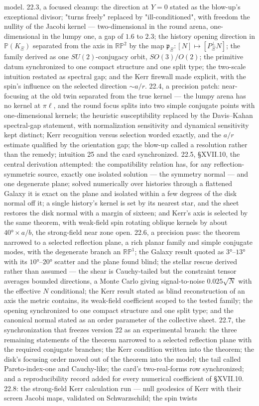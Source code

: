 model. 22.3, a focused cleanup: the direction at $Y = 0$ stated as the blow-up's exceptional divisor; "turns freely" replaced by "ill-conditioned", with freedom the nullity of the Jacobi kernel — two-dimensional in the round arena, one-dimensional in the lumpy one, a gap of $1.6$ to $2.3$; the history opening direction in $\mathbb P(K_\Xi)$ separated from the axis in $\mathbb{RP}^2$ by the map $\mathfrak p_\Xi:[N]\mapsto[P^\perp_\Xi N]$; the family derived as one $SU(2)$-conjugacy orbit, $SO(3)/O(2)$; the primitive datum synchronized to one compact structure and one split type; the two-scale intuition restated as spectral gap; and the Kerr firewall made explicit, with the spin's influence on the selected direction $\sim a/r$. 22.4, a precision patch: near-focusing at the old twin separated from the true kernel — the lumpy arena has no kernel at $\pi\ell$, and the round focus splits into two simple conjugate points with one-dimensional kernels; the heuristic susceptibility replaced by the Davis–Kahan spectral-gap statement, with normalization sensitivity and dynamical sensitivity kept distinct; Kerr recognition versus selection worded exactly, and the $a/r$ estimate qualified by the orientation gap; the blow-up called a resolution rather than the remedy; intuition 25 and the card synchronized. 22.5, §XVII.10, the central derivation attempted: the compatibility relation has, for any reflection-symmetric source, exactly one isolated solution — the symmetry normal — and one degenerate plane; solved numerically over histories through a flattened Galaxy it is exact on the plane and isolated within a few degrees of the disk normal off it; a single history's kernel is set by its nearest star, and the sheet restores the disk normal with a margin of sixteen; and Kerr's axis is selected by the same theorem, with weak-field spin rotating oblique kernels by about $40°\times a/b$, the strong-field near zone open. 22.6, a precision pass: the theorem narrowed to a selected reflection plane, a rich planar family and simple conjugate modes, with the degenerate branch an $\mathbb{RP}^1$; the Galaxy result quoted as $3°$–$13°$ with its $10°$–$20°$ scatter and the plane found blind; the stellar rescue derived rather than assumed — the shear is Cauchy-tailed but the constraint tensor averages bounded directions, a Monte Carlo giving signal-to-noise $0.025\sqrt N$ with the effective $N$ conditional; the Kerr result stated as blind reconstruction of an axis the metric contains, its weak-field coefficient scoped to the tested family; the opening synchronized to one compact structure and one split type; and the canonical normal stated as an order parameter of the collective sheet. 22.7, the synchronization that freezes version 22 as an experimental branch: the three remaining statements of the theorem narrowed to a selected reflection plane with the required conjugate branches; the Kerr condition written into the theorem; the disk's focusing order moved out of the theorem into the model; the tail called Pareto-index-one and Cauchy-like; the card's two-real-forms row synchronized; and a reproducibility record added for every numerical coefficient of §XVII.10. 22.8: the strong-field Kerr calculation run — null geodesics of Kerr with their screen Jacobi maps, validated on Schwarzschild; the spin twists 